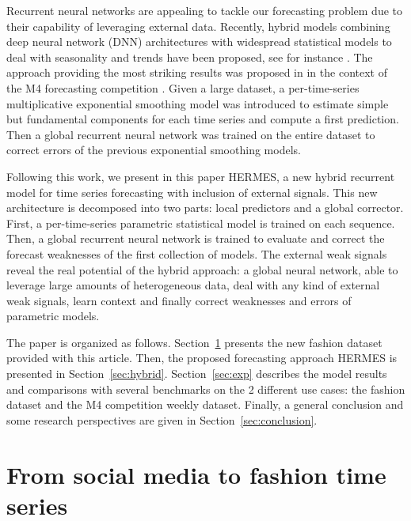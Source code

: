 \documentclass[10pt]{article} %
\begin{document}
Recurrent neural networks are appealing to tackle our forecasting problem due to their capability of leveraging external data.  Recently, hybrid models combining deep neural network (DNN) architectures with widespread statistical models to deal with seasonality and trends have been proposed, see for instance  \citet{zhang2003,jianwei2019,bandara2020}. The approach providing the most striking results was proposed in  \citet{smyl2020} in the context of the M4 forecasting competition \citep{makridakis2020}.  Given a large dataset, a per-time-series multiplicative exponential smoothing model was introduced to estimate simple but fundamental components for each time series and compute a first prediction. Then a global recurrent neural network was trained on the entire dataset to correct errors of the previous exponential smoothing models. 

Following this work, we present in this paper HERMES, a new hybrid recurrent model for time series forecasting with inclusion of external signals. This new architecture is decomposed  into two parts: local predictors and a global corrector.  First, a per-time-series parametric statistical model is trained on each sequence. Then, a global recurrent neural network is trained to evaluate and correct the forecast weaknesses of the first collection of models. The external weak signals reveal the real potential of the hybrid approach: a global neural network, able to leverage large amounts of heterogeneous data, deal with any kind of external weak signals, learn context and finally correct weaknesses and errors of parametric models.

The paper is organized as follows. Section~\ref{sec:dataset} presents the new fashion dataset provided with this article. Then, the proposed forecasting approach HERMES is presented in Section~\ref{sec:hybrid}. Section~\ref{sec:exp} describes the model results and comparisons with several benchmarks on the 2 different use cases: the fashion dataset and the M4 competition weekly dataset. Finally, a general conclusion and some research perspectives are given in  Section~\ref{sec:conclusion}.

\section{From social media to fashion time series}
\label{sec:dataset}
\end{document}
